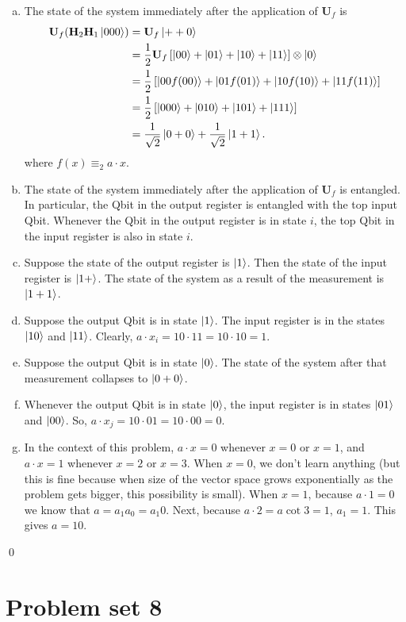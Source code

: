 \documentclass{book}
\theoremstyle{definition}
\newcommand{\nn}{\nonumber}
\newcommand{\f}[2]{\frac{#1}{#2}}
\newcommand{\lb}{\left[}
\newcommand{\rb}{\right]}
\newcommand{\U}{\mathbf{U}}
\newcommand{\had}{\mathbf{H}}
\begin{document}
\begin{enumerate}[(a)]
	\item The state of the system immediately after the application of $\U_f$ is 
	\begin{align}
	\U_f (\had_2\had_1 \ket{000}) 
	&= \U_f \ket{++0} \nn\\
	&= \f{1}{2}\U_f \lb \ket{00} + \ket{01} + \ket{10}+ \ket{11} \rb \otimes \ket{0}\nn\\
	&= \f{1}{2}\lb \ket{00f(00)} + \ket{01f(01)} + \ket{10f(10)}+ \ket{11f(11)}  \rb\nn\\
	&= \f{1}{2} \lb \ket{000} + \ket{010} + \ket{101} + \ket{111} \rb\nn\\
	&= \f{1}{\sqrt{2}} \ket{0 + 0} + \f{1}{\sqrt{2}} \ket{1 + 1} .
	\end{align}
	where $f(x) \equiv_2 a\cdot x$.
	
	\item  The state of the system immediately after the application of $\U_f$ is entangled. In particular, the Qbit in the output register is entangled with the top input Qbit. Whenever the Qbit in the output register is in state $i$, the top Qbit in the input register is also in state $i$.
	
	\item Suppose the state of the output register is $\ket{1}$. Then the state of the input register is $\ket{1+}$. The state of the system as a result of the measurement is $\ket{1+1}$. 
	
	\item Suppose the output Qbit is in state $\ket{1}$. The input register is in the states $\ket{10}$ and $\ket{11}$. Clearly, $a\cdot x_i = 10 \cdot 11 = 10 \cdot 10 = 1$.  
	
	\item Suppose the output Qbit is in state $\ket{0}$. The state of the system after that measurement collapses to $\ket{0 + 0}$. 
	
	
	\item Whenever the output Qbit is in state $\ket{0}$, the input register is in states $\ket{01}$ and $\ket{00}$. So, $a\cdot x_j = 10 \cdot 01 = 10 \cdot 00 = 0$.  
	
	\item In the context of this problem, $a \cdot x = 0$ whenever $x = 0$ or $x = 1$, and $a \cdot x=  1$ whenever $x = 2$ or $x=3$. When $x=0$, we don't learn anything (but this is fine because when size of the vector space grows exponentially as the problem gets bigger, this possibility is small). When $x=1$, because $a \cdot 1 = 0$ we know that $a = a_1 a_0 = a_1 0$. Next, because $a \cdot 2 = a \cot 3 = 1$, $a_1 = 1$. This gives $a = 10$. 
\end{enumerate}






\qed


\newpage















\section{Problem set 8}


\newpage
\end{document}

